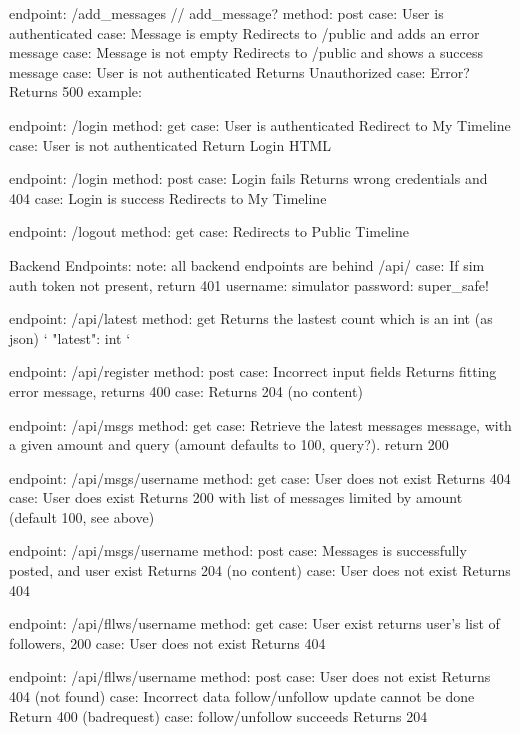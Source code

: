     endpoint: /add_messages // add_message?
        method: post
        case: User is authenticated
            case: Message is empty
                Redirects to /public and adds an error message
            case: Message is not empty
                Redirects to /public and shows a success message
        case: User is not authenticated
            Returns Unauthorized
        case: Error?
            Returns 500
        example:

            
    endpoint: /login
        method: get
        case: User is authenticated
            Redirect to My Timeline
        case: User is not authenticated
            Return Login HTML

    endpoint: /login
        method: post
        case: Login fails
            Returns wrong credentials and 404
        case: Login is success
            Redirects to My Timeline

    endpoint: /logout
        method: get
        case: 
            Redirects to Public Timeline

Backend Endpoints:
    note: all backend endpoints are behind /api/
    case: If sim auth token not present, return 401
    username: simulator
    password: super_safe!


    endpoint: /api/latest
        method: get
            Returns the lastest count which is an int (as json) `{ "latest": int }`

    endpoint: /api/register
        method: post
        case: Incorrect input fields
            Returns fitting error message, returns 400
        case: 
            Returns 204 (no content)

    endpoint: /api/msgs
        method: get
        case: 
            Retrieve the latest messages message, with a given amount and query (amount defaults to 100, query?). return 200
    
    endpoint: /api/msgs/{username}
        method: get
        case: User does not exist
            Returns 404
        case: User does exist
            Returns 200 with list of messages limited by amount (default 100, see above)
    
    endpoint: /api/msgs/{username}
        method: post
        case: Messages is successfully posted, and user exist
            Returns 204 (no content)
        case: User does not exist
            Returns 404

    endpoint: /api/fllws/{username}
        method: get
        case: User exist
            returns user's list of followers, 200
        case: User does not exist
            Returns 404
    
    endpoint: /api/fllws/{username}
        method: post
        case: User does not exist
            Returns 404 (not found)
        case: Incorrect data follow/unfollow update cannot be done
            Return 400 (badrequest)
        case: follow/unfollow succeeds
            Returns 204
